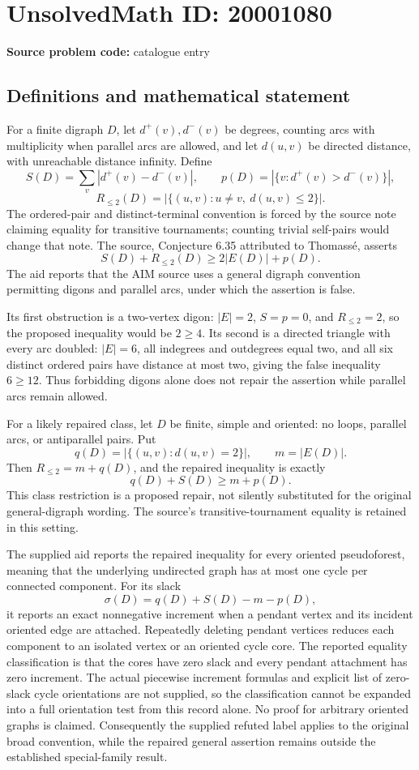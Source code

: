 \documentclass[11pt]{article}
\begin{document}
\section*{UnsolvedMath ID: 20001080}
\textbf{Source problem code:} catalogue entry
\subsection{Definitions and mathematical statement}
For a finite digraph \(D\), let \(d^+(v),d^-(v)\) be degrees, counting arcs with multiplicity when parallel arcs are allowed, and let \(d(u,v)\) be directed distance, with unreachable distance infinity. Define
\[
 S(D)=\sum_v|d^+(v)-d^-(v)|,\qquad
 p(D)=|\{v:d^+(v)>d^-(v)\}|,
\]
\[
 R_{\le2}(D)=|\{(u,v):u\ne v,\ d(u,v)\le2\}|.
\]
The ordered-pair and distinct-terminal convention is forced by the source note claiming equality for transitive tournaments; counting trivial self-pairs would change that note. The source, Conjecture 6.35 attributed to Thomass\'e, asserts
\[
 S(D)+R_{\le2}(D)\ge2|E(D)|+p(D).
\]
The aid reports that the AIM source uses a general digraph convention permitting digons and parallel arcs, under which the assertion is false.

Its first obstruction is a two-vertex digon: \(|E|=2\), \(S=p=0\), and \(R_{\le2}=2\), so the proposed inequality would be \(2\ge4\). Its second is a directed triangle with every arc doubled: \(|E|=6\), all indegrees and outdegrees equal two, and all six distinct ordered pairs have distance at most two, giving the false inequality \(6\ge12\). Thus forbidding digons alone does not repair the assertion while parallel arcs remain allowed.

For a likely repaired class, let \(D\) be finite, simple and oriented: no loops, parallel arcs, or antiparallel pairs. Put
\[
 q(D)=|\{(u,v):d(u,v)=2\}|,\qquad m=|E(D)|.
\]
Then \(R_{\le2}=m+q(D)\), and the repaired inequality is exactly
\[
 q(D)+S(D)\ge m+p(D).
\]
This class restriction is a proposed repair, not silently substituted for the original general-digraph wording. The source's transitive-tournament equality is retained in this setting.

The supplied aid reports the repaired inequality for every oriented pseudoforest, meaning that the underlying undirected graph has at most one cycle per connected component. For its slack
\[
 \sigma(D)=q(D)+S(D)-m-p(D),
\]
it reports an exact nonnegative increment when a pendant vertex and its incident oriented edge are attached. Repeatedly deleting pendant vertices reduces each component to an isolated vertex or an oriented cycle core. The reported equality classification is that the cores have zero slack and every pendant attachment has zero increment. The actual piecewise increment formulas and explicit list of zero-slack cycle orientations are not supplied, so the classification cannot be expanded into a full orientation test from this record alone. No proof for arbitrary oriented graphs is claimed. Consequently the supplied refuted label applies to the original broad convention, while the repaired general assertion remains outside the established special-family result.
\end{document}
